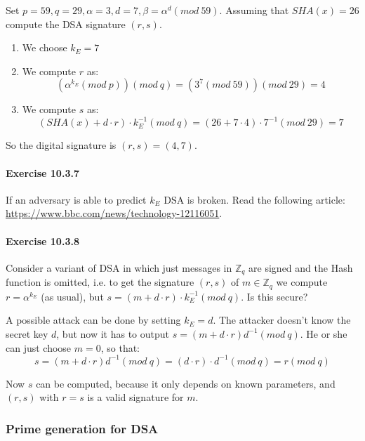 \documentclass{article}
\begin{document}
	Set $p = 59, q = 29, \alpha = 3, d = 7, \beta = \alpha^{d} (mod ~ 59)$.
	Assuming that $SHA(x) = 26$ compute the DSA signature $(r, s)$.

	\vspace{20pt}

	\begin{enumerate}
		\item We choose $k_{E} = 7$
		\item We compute $r$ as:
			$$
				(\alpha^{k_{E}}(mod ~ p)) (mod ~ q) = 
				(3^{7} (mod ~ 59)) (mod ~ 29) = 4
			$$
		\item We compute $s$ as:
			$$
				(SHA(x) + d\cdot r) \cdot k_{E}^{-1} (mod ~ q) = 
				(26 + 7 \cdot 4) \cdot 7^{-1} (mod ~ 29) = 
				7
			$$
	\end{enumerate}

	So the digital signature is $(r, s) = (4, 7)$.

	\paragraph{Exercise 10.3.7}

	If an adversary is able to predict $k_{E}$ DSA is broken. Read the following
	article: \url{https://www.bbc.com/news/technology-12116051}.

	\paragraph{Exercise 10.3.8}

	Consider a variant of DSA in which just messages in $\mathbb{Z}_{q}$ are signed 
	and the Hash function is omitted, i.e. to get the signature $(r,s)$ of $m \in
	\mathbb{Z}_{q}$ we compute $r=\alpha^{k_{E}}$ (as  usual), but
	$s= (m+d\cdot r)\cdot k^{-1}_{E}(mod ~ q)$.  Is this secure?

	\vspace{20pt}

	A possible attack can be done by setting $k_{E} = d$. The attacker doesn't
	know the secret key $d$, but now it has to output $s = (m + d \cdot
	r) d^{-1} (mod ~ q)$. He or she can just choose $m = 0$, so that:
	$$
		s = (m + d \cdot r) d^{-1} (mod ~ q) = (d \cdot r) \cdot d^{-1} (mod ~ q) 
		= r (mod ~ q)
	$$

	Now $s$ can be computed, because it only depends on known parameters, 
	and $(r, s)$ with $r = s$ is a valid signature for $m$.

	\subsubsection{Prime generation for DSA}
\end{document}
